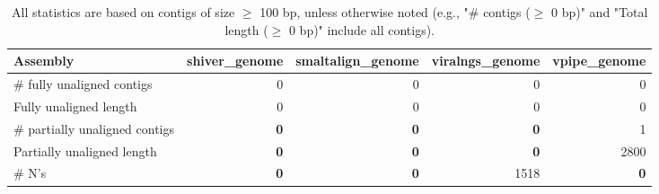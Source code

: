 \documentclass[12pt,a4paper]{article}
\begin{document}
\begin{table}[ht]
\begin{center}
\caption{All statistics are based on contigs of size $\geq$ 100 bp, unless otherwise noted (e.g., "\# contigs ($\geq$ 0 bp)" and "Total length ($\geq$ 0 bp)" include all contigs).}
\begin{tabular}{|l*{4}{|r}|}
\hline
Assembly & shiver\_genome & smaltalign\_genome & viralngs\_genome & vpipe\_genome \\ \hline
\# fully unaligned contigs & 0 & 0 & 0 & 0 \\ \hline
Fully unaligned length & 0 & 0 & 0 & 0 \\ \hline
\# partially unaligned contigs & {\bf 0} & {\bf 0} & {\bf 0} & 1 \\ \hline
Partially unaligned length & {\bf 0} & {\bf 0} & {\bf 0} & 2800 \\ \hline
\# N's & {\bf 0} & {\bf 0} & 1518 & {\bf 0} \\ \hline
\end{tabular}
\end{center}
\end{table}
\end{document}
